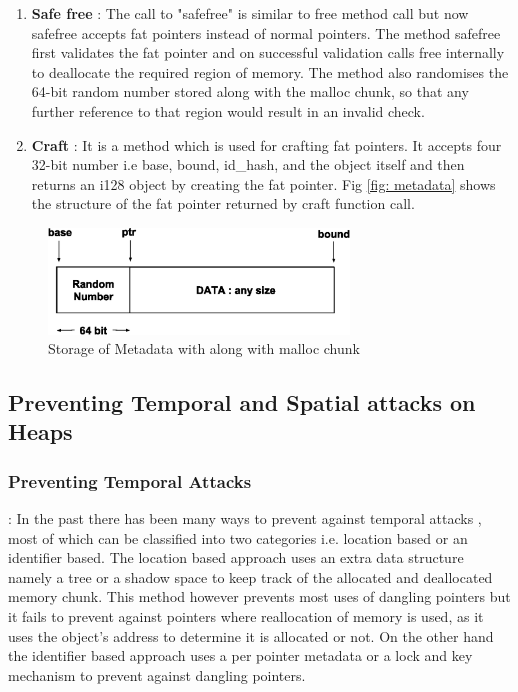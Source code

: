 \begin{enumerate}
    \item \textbf{Safe free} \label{safefree}: The call to "safefree" is similar to free method call but now safefree accepts fat pointers instead of normal pointers. The method safefree first validates the fat pointer and on successful validation calls free internally to deallocate the required region of memory. The method also randomises the 64-bit random number stored along with the malloc chunk, so that any further reference to that region would result in an invalid check.
    \item \textbf{Craft} : It is a method which is used for crafting fat pointers. It accepts four 32-bit number i.e base, bound, id\_hash, and the object itself and then returns an i128 object by creating the fat pointer. Fig \ref{fig: metadata} shows the structure of the fat pointer returned by craft function call.
\end{enumerate}

\begin{figure}
\centering
\captionsetup{justification=centering}
\includegraphics[width=8cm]{malloc.eps}
\caption{Storage of Metadata with along with malloc chunk}
\label{fig:malloc_chuck}
\hrulefill
\end{figure}

\subsection{Preventing Temporal and Spatial attacks on Heaps}

\subsubsection{Preventing Temporal Attacks} :\label{temp_heap}
In the past there has been many ways to prevent against temporal attacks \cite{Austin,DieHard,Dhurjati,Dhurjati1,Purify,Valgrind,Exterminator,Fischer,MemTracker,BackCompTrans,CETS}, most of which can be classified into two categories i.e. location based or an identifier based. The location based\cite{Purify,BackBoundsChecking,Valgrind,MemTracker} approach uses an extra data structure namely a tree or a shadow space to keep track of the allocated and deallocated memory chunk. This method however prevents most uses of dangling pointers but it fails to prevent against pointers where reallocation of memory is used, as it uses the object's address to determine it is allocated or not. On the other hand the identifier based\cite{CETS,Fischer,BackCompTrans} approach uses a per pointer metadata or a lock and key mechanism to prevent against dangling pointers.

